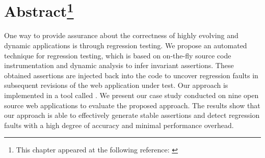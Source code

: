 \section*{Abstract\footnote{This chapter appeared at the following reference: \cite{mirshokraie:icwe12}}}
One way to provide assurance about the correctness of highly evolving and dynamic applications is through regression testing. We propose an automated technique for \javascript regression testing, which is based on on-the-fly \javascript source code instrumentation and dynamic analysis to infer invariant assertions. These obtained assertions are injected back into the \javascript code to uncover regression faults in subsequent revisions of the web application under test.
Our approach is implemented in a tool called \jsart. We present our case study conducted on nine open source web applications to evaluate the proposed approach. The results show that our approach is able to effectively generate stable assertions and detect \javascript regression faults with a high degree of accuracy and minimal performance overhead.


